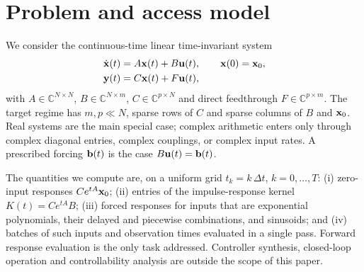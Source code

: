 \section{Problem and access model}\label{sec:problem}

We consider the continuous-time linear time-invariant system
\begin{equation}\label{eq:lti}
\begin{aligned}
\dot{{\bf x}}(t)&=A{\bf x}(t)+B{\bf u}(t),\qquad {\bf x}(0)={\bf x}_0,\\
{\bf y}(t)&=C{\bf x}(t)+F{\bf u}(t),
\end{aligned}
\end{equation}
with $A\in\mathbb{C}^{N\times N}$, $B\in\mathbb{C}^{N\times m}$, $C\in\mathbb{C}^{p\times N}$ and direct feedthrough $F\in\mathbb{C}^{p\times m}$. The target regime has $m,p\ll N$, sparse rows of $C$ and sparse columns of $B$ and ${\bf x}_0$. Real systems are the main special case; complex arithmetic enters only through complex diagonal entries, complex couplings, or complex input rates. A prescribed forcing ${\bf b}(t)$ is the case $B{\bf u}(t)={\bf b}(t)$.

The quantities we compute are, on a uniform grid $t_k=k\,\Delta t$, $k=0,\dots,T$:
(i) zero-input responses $C e^{tA}{\bf x}_0$;
(ii) entries of the impulse-response kernel $K(t)=Ce^{tA}B$;
(iii) forced responses for inputs that are exponential polynomials, their delayed and piecewise combinations, and sinusoids; and
(iv) batches of such inputs and observation times evaluated in a single pass.
Forward response evaluation is the only task addressed. Controller synthesis, closed-loop operation and controllability analysis are outside the scope of this paper.

